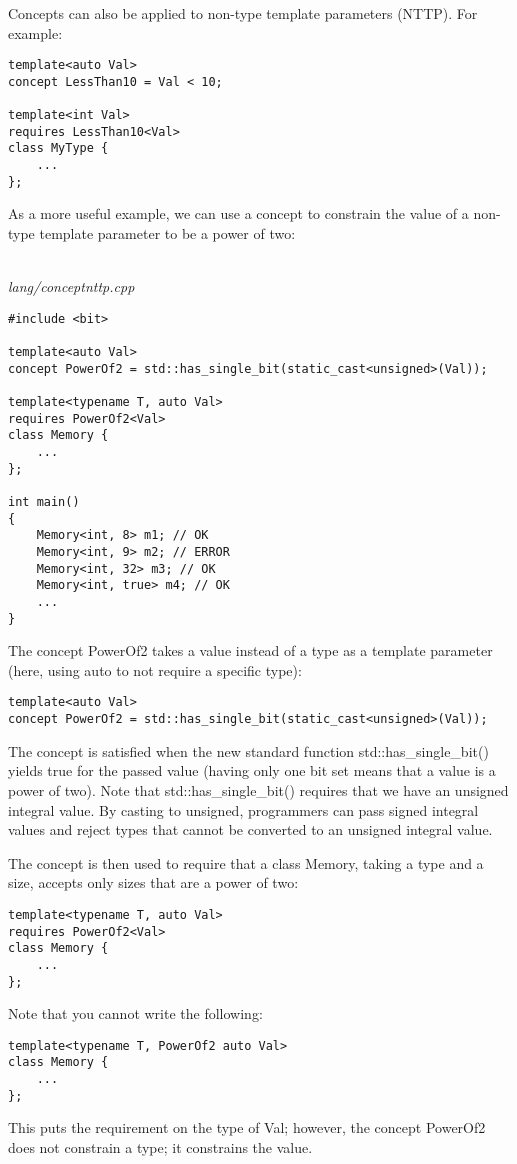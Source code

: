 Concepts can also be applied to non-type template parameters (NTTP). For example:

\begin{lstlisting}[style=styleCXX]
template<auto Val>
concept LessThan10 = Val < 10;

template<int Val>
requires LessThan10<Val>
class MyType {
	...
};
\end{lstlisting}

As a more useful example, we can use a concept to constrain the value of a non-type template parameter to be a power of two:

\noindent
\hspace*{\fill} \\ %
\textit{lang/conceptnttp.cpp}

\begin{lstlisting}[style=styleCXX]
#include <bit>

template<auto Val>
concept PowerOf2 = std::has_single_bit(static_cast<unsigned>(Val));

template<typename T, auto Val>
requires PowerOf2<Val>
class Memory {
	...
};

int main()
{
	Memory<int, 8> m1; // OK
	Memory<int, 9> m2; // ERROR
	Memory<int, 32> m3; // OK
	Memory<int, true> m4; // OK
	...
}
\end{lstlisting}

The concept PowerOf2 takes a value instead of a type as a template parameter (here, using auto to not require a specific type):

\begin{lstlisting}[style=styleCXX]
template<auto Val>
concept PowerOf2 = std::has_single_bit(static_cast<unsigned>(Val));
\end{lstlisting}

The concept is satisfied when the new standard function std::has\_single\_bit() yields true for the passed value (having only one bit set means that a value is a power of two). Note that std::has\_single\_bit() requires that we have an unsigned integral value. By casting to unsigned, programmers can pass signed integral values and reject types that cannot be converted to an unsigned integral value.

The concept is then used to require that a class Memory, taking a type and a size, accepts only sizes that are a power of two:

\begin{lstlisting}[style=styleCXX]
template<typename T, auto Val>
requires PowerOf2<Val>
class Memory {
	...
};
\end{lstlisting}

Note that you cannot write the following:


\begin{lstlisting}[style=styleCXX]
template<typename T, PowerOf2 auto Val>
class Memory {
	...
};
\end{lstlisting}

This puts the requirement on the type of Val; however, the concept PowerOf2 does not constrain a type; it constrains the value.








